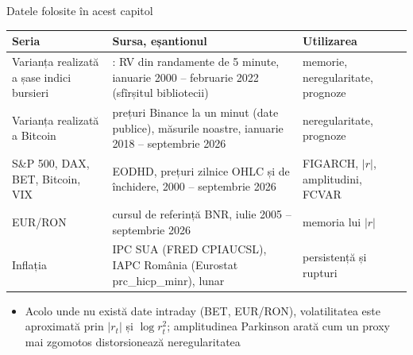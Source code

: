 \begin{frame}{Datele folosite în acest capitol}
\itemsize{\footnotesize}
\begin{center}
\scriptsize
\begin{tabular}{>{\raggedright\arraybackslash}p{3.2cm}>{\raggedright\arraybackslash}p{5.4cm}>{\raggedright\arraybackslash}p{3.6cm}}
\toprule
\textbf{Seria} & \textbf{Sursa, eșantionul} & \textbf{Utilizarea} \\
\midrule
Varianța realizată a șase indici bursieri & : RV din randamente de 5 minute, ianuarie 2000 -- februarie 2022 (sfîrșitul bibliotecii) & memorie, neregularitate, prognoze \\
Varianța realizată a Bitcoin & prețuri Binance la un minut (date publice), măsurile noastre, ianuarie 2018 -- septembrie 2026 & neregularitate, prognoze \\
S\&P 500, DAX, BET, Bitcoin, VIX & EODHD, prețuri zilnice OHLC și de închidere, 2000 -- septembrie 2026 & FIGARCH, $|r|$, amplitudini, FCVAR \\
EUR/RON & cursul de referință BNR, iulie 2005 -- septembrie 2026 & memoria lui $|r|$ \\
Inflația & IPC SUA (FRED CPIAUCSL), IAPC România (Eurostat prc\_hicp\_minr), lunar & persistență și rupturi \\
\bottomrule
\end{tabular}
\end{center}
\begin{itemize}
    \item Acolo unde nu există date intraday (BET, EUR/RON), volatilitatea este aproximată prin $|r_t|$ și $\log r_t^2$; amplitudinea Parkinson arată cum un proxy mai zgomotos distorsionează neregularitatea
\end{itemize}
\end{frame}

